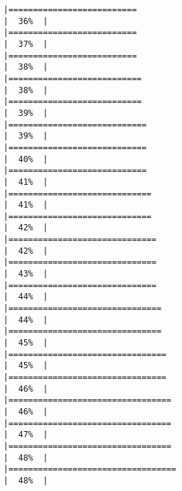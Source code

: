 \documentclass[
]{article}
\begin{document}
\begin{verbatim}
|==========================                                            |  36%  |                                                                              |==========================                                            |  37%  |                                                                              |==========================                                            |  38%  |                                                                              |===========================                                           |  38%  |                                                                              |===========================                                           |  39%  |                                                                              |============================                                          |  39%  |                                                                              |============================                                          |  40%  |                                                                              |============================                                          |  41%  |                                                                              |=============================                                         |  41%  |                                                                              |=============================                                         |  42%  |                                                                              |==============================                                        |  42%  |                                                                              |==============================                                        |  43%  |                                                                              |==============================                                        |  44%  |                                                                              |===============================                                       |  44%  |                                                                              |===============================                                       |  45%  |                                                                              |================================                                      |  45%  |                                                                              |================================                                      |  46%  |                                                                              |=================================                                     |  46%  |                                                                              |=================================                                     |  47%  |                                                                              |=================================                                     |  48%  |                                                                              |==================================                                    |  48%  |                                                                              
\end{verbatim}
\end{document}
